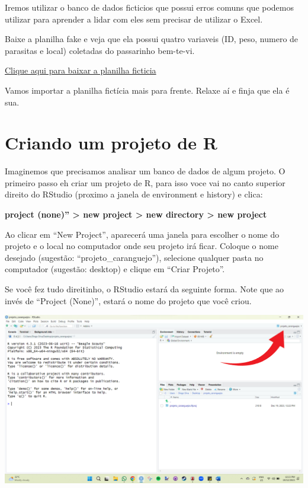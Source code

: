 \documentclass[
]{book}
\begin{document}
Iremos utilizar o banco de dados ficticios que possui erros comuns que podemos utilizar para aprender a lidar com eles sem precisar de utilizar o Excel.

Baixe a planilha fake e veja que ela possui quatro variaveis (ID, peso, numero de parasitas e local) coletadas do passarinho bem-te-vi.

\href{data/fake_data.xlsx}{Clique aqui para baixar a planilha ficticia}

Vamos importar a planilha fictícia mais para frente. Relaxe aí e finja que ela é sua.

\hypertarget{criando-um-projeto-de-r}{%
\section{Criando um projeto de R}\label{criando-um-projeto-de-r}}

Imaginemos que precisamos analisar um banco de dados de algum projeto. O primeiro passo eh criar um projeto de R, para isso voce vai no canto superior direito do RStudio (proximo a janela de environment e history) e clica:

\textbf{project (none)'' \textgreater{} new project \textgreater{} new directory \textgreater{} new project}

Ao clicar em ``New Project'', aparecerá uma janela para escolher o nome do projeto e o local no computador onde seu projeto irá ficar. Coloque o nome desejado (sugestão: ``projeto\_caranguejo''), selecione qualquer pasta no computador (sugestão: desktop) e clique em ``Criar Projeto''.

Se você fez tudo direitinho, o RStudio estará da seguinte forma. Note que ao invés de ``Project (None)'', estará o nome do projeto que você criou.

\includegraphics{img/tela_do_projeto.png}
\end{document}
